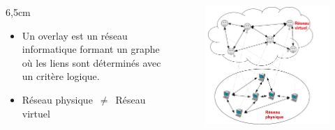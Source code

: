 \documentclass{beamer}
\begin{document}
  \begin{frame}
	
 	\begin{columns}
          \begin{column}{6,5cm}
	    	\begin{itemize}
		\item Un overlay est un réseau informatique formant un graphe où les liens sont déterminés avec un critère logique.\\
		\item Réseau physique~$\neq$~Réseau virtuel
		\end{itemize}
	  \end{column}
          \begin{column}{5cm}
        	\begin{figure}
        	  \includegraphics[scale=0.2]{./Ressources/Images/overlay.png}\\
        	  \label{Propa_Algo}
        	\end{figure}
          \end{column}
        \end{columns}
	
  \end{frame}
	
\end{document}
